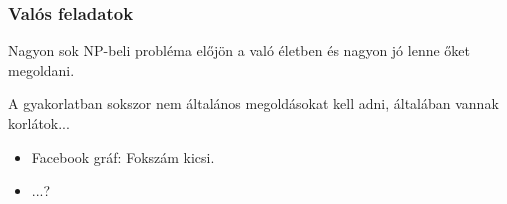\begin{frame}
\frametitle{Valós feladatok}
Nagyon sok NP-beli probléma előjön a való életben és nagyon jó lenne őket megoldani.

A gyakorlatban sokszor nem általános megoldásokat kell adni, általában vannak korlátok...

\begin{itemize}
\item Facebook gráf: Fokszám kicsi.
\item ...?
\end{itemize}

\end{frame}

